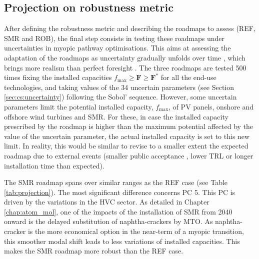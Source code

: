 \subsection{Projection on robustness metric}
\label{subsec:RobPol:Projection}
After defining the robustness metric and describing the roadmaps to assess (\ie REF, SMR and ROB), the final step consists in testing these roadmaps under uncertainties in myopic pathway optimisations. This aims at assessing the adaptation of the roadmaps as uncertainty gradually unfolds over time \cite{moret2020overcapacity}, which brings more realism than perfect foresight \cite{poncelet2016myopic}. The three roadmaps are tested 500 times fixing the installed capacities $f_{\mathrm{max}}\geq\textbf{F}\geq\textbf{F}^*$ for all the end-use technologies, and taking values of the 34 uncertain parameters (see Section \ref{sec:cs:uncertainty}) following the Sobol' sequence. However,  some uncertain parameters limit the potential installed capacity, $f_{\mathrm{max}}$, of \gls{PV} panels, onshore and offshore wind turbines and \gls{SMR}. For these, in case the installed capacity prescribed by the roadmap is higher than the maximum potential affected by the value of the uncertain parameter, the actual installed capacity is set to this new limit. In reality, this would be similar to revise to a smaller extent the expected roadmap due to external events (\eg smaller public acceptance \cite{zoellner2008public,sam2014small}, lower \gls{TRL} or longer installation time than expected).

The SMR roadmap spans over similar ranges as the REF case (see Table \ref{tab:projection}). The most significant difference concerns PC 5. This PC is driven by the variations in the \gls{HVC} sector. As detailed in Chapter \ref{chap:atom_mol}, one of the impacts of the installation of \gls{SMR} from 2040 onward is the delayed substitution of naphtha-crackers by \gls{MTO}. As naphtha-cracker is the more economical option in the near-term of a myopic transition, this smoother modal shift leads to less variations of installed capacities. This makes the SMR roadmap more robust than the REF case. 


